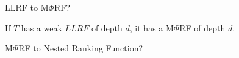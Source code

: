 \documentclass[11pt]{beamer}
\begin{document}
\begin{frame}{LLRF to M$\Phi$RF?}
\begin{theorem}
If $T$ has a weak $LLRF$ of depth $d$, it has a M$\Phi$RF of depth $d$.

\end{theorem}

\end{frame}

\begin{frame}{M$\Phi$RF to Nested Ranking Function?}


\end{frame}
\end{document}
